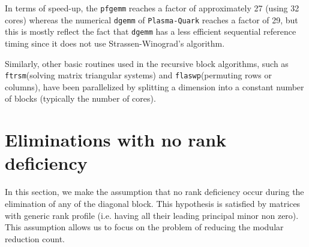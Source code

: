 \documentclass{article}
\newcommand{\pfgemm}{\texttt{pfgemm}\xspace}
\newcommand{\dgemm}{\texttt{dgemm}\xspace}
\newcommand{\ftrsm}{\texttt{ftrsm}\xspace}
\newcommand{\flaswp}{\texttt{flaswp}\xspace}
\newcommand{\plasmaquark}{\texttt{Plasma-Quark}\xspace}
\begin{document}
In terms of speed-up, the \pfgemm reaches a factor of approximately 27 (using
32 cores) whereas the numerical \dgemm of \plasmaquark reaches a factor of 29,
but this is mostly reflect the fact that \dgemm has a less efficient sequential
reference timing since it does not use Strassen-Winograd's algorithm.
 
 
 
 
 
 
 
 
 
 
 

Similarly, other basic routines used in the recursive block algorithms, such as
\ftrsm (solving matrix triangular systems) and \flaswp (permuting rows or
columns), have been parallelized by splitting a dimension into a constant number
of blocks (typically the number of cores).

\section{Eliminations with no rank deficiency}
\label{sec:fullrank}

In this section, we make the assumption that no rank deficiency occur during the
elimination of any of the diagonal block. This hypothesis is satisfied by
matrices with generic rank profile (i.e. having all their leading principal
minor non zero). This assumption allows us to focus on the problem of reducing
the modular reduction count.

 
 
 
 
 
 
 
 
 
 
 
 

 
 
 
 
 
 
 
 
 
 
 
 
 
 
 
 
    
 
 
 
 
 
 
 
 

 
 
 
 
 
 

 
 
 
 
\end{document}

